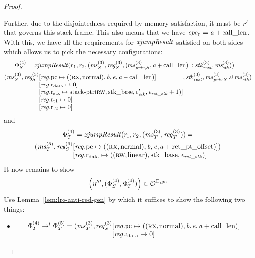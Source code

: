 \begin{proof}
\begin{description}
\begin{itemize}
      Further, due to the disjointedness required by memory satisfaction, it must be $r'$ that governs this stack frame.
      This also means that we have $\opc_0 =  \aaddr+\calllen$.
      With this, we have all the requirements for $\var{xjumpResult}$ satisfied on
      both sides which allows us to pick the necessary configurations:
      \begin{multline*}
        \Phi^{(4)}_S=\xjumpResult{r_1}{r_2}{(\ms_S^{(3)},\reg[3]_S,(\ms_{\priv,S}^{(3)},\aaddr+\calllen)
          :: \stk^{(3)}_\var{rest},\ms_\stk^{(3)})} =\\
        (\ms_S^{(3)},\reg[3]_S
        \arraycolsep=0pt
        \begin{array}[t]{l}
          \updReg{\pcreg}{((\rx,\normal),\baddr,\eaddr,\aaddr+\calllen)} \\
          \updReg{\rdata}{0} \\
          \updReg{\rstk}{\stkptr{\rw,\stkb,e_\stk',\eaddr_\var{ret\_stk}+1}} \\
          \updReg{\rtmp{1}}{0} \\
          \updReg{\rtmp{2}}{0}
        \end{array}
        ,\stk^{(3)}_\var{rest},\ms_{\priv,S}^{(3)} \uplus \ms_\stk^{(3)})
      \end{multline*}
      and
      \begin{multline*}
        \Phi^{(4)}_T=\xjumpResult{r_1}{r_2}{(\ms_T^{(3)},\reg[3]_T)} =\\
        (\ms_T^{(3)},\reg[3]_S
        \arraycolsep=0pt
        \begin{array}[t]{l}
          \updReg{\pcreg}{((\rx,\normal),\baddr,\eaddr,\aaddr+\retoffset)} \\
          \updReg{\rdata}{((\rw,\linear),\stkb,\eaddr_\var{ret\_stk})}
        \end{array})
      \end{multline*}
      It now remains to show
      \[
        \npair[n''']{(\Phi^{(4)}_S,\Phi^{(4)}_T)} \in \lro
      \]
      Use Lemma~\ref{lem:lro-anti-red-gen} by which it suffices to show the
      following two things:
      \begin{itemize}
      \item
        \[
          \Phi^{(4)}_T \step[l] \Phi^{(5)}_T = (\ms_T^{(3)},\reg[3]_S
          \arraycolsep=0pt
          \begin{array}[t]{l}
            \updReg{\pcreg}{((\rx,\normal),\baddr,\eaddr,\aaddr+\calllen)} \\
            \updReg{\rdata}{0} \\

\end{array}\]
\end{itemize}
\end{itemize}
\end{description}
\end{proof}
